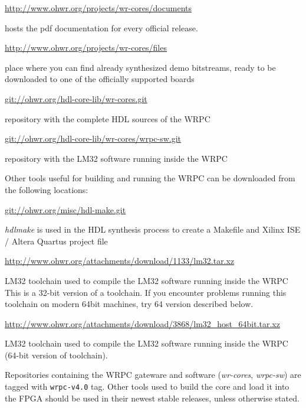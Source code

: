 \documentclass[a4paper, 12pt]{article}
\begin{document}
\begin{itemize*}

\item \url{http://www.ohwr.org/projects/wr-cores/documents}

	hosts the pdf documentation for every official release.

\item \url{http://www.ohwr.org/projects/wr-cores/files}

	place where you can find already synthesized demo bitstreams, ready to be
  downloaded to one of the officially supported boards

\item \url{git://ohwr.org/hdl-core-lib/wr-cores.git}

	repository with the complete HDL sources of the WRPC

\item \url{git://ohwr.org/hdl-core-lib/wr-cores/wrpc-sw.git}

  repository with the LM32 software running inside the WRPC

\end{itemize*}
Other tools useful for building and running the WRPC can be downloaded from the
following locations:

\begin{itemize*}

\item \url{git://ohwr.org/misc/hdl-make.git}

  \textit{hdlmake} is used in the HDL synthesis process to create a Makefile and
  Xilinx ISE / Altera Quartus project file

\item \url{http://www.ohwr.org/attachments/download/1133/lm32.tar.xz}

  LM32 toolchain used to compile the LM32 software running inside the WRPC
  This is a 32-bit version of a toolchain. If you encounter problems running
  this toolchain on modern 64bit machines, try 64 version described below.

\item \url{http://www.ohwr.org/attachments/download/3868/lm32_host_64bit.tar.xz}

  LM32 toolchain used to compile the LM32 software running inside the WRPC
  (64-bit version of toolchain).

  \end{itemize*}
Repositories containing the WRPC gateware and software (\textit{wr-cores},
\textit{wrpc-sw}) are tagged with \texttt{wrpc-v4.0} tag. Other tools used to
build the core and load it into the FPGA should be used in their newest stable
releases, unless otherwise stated.
\end{document}
